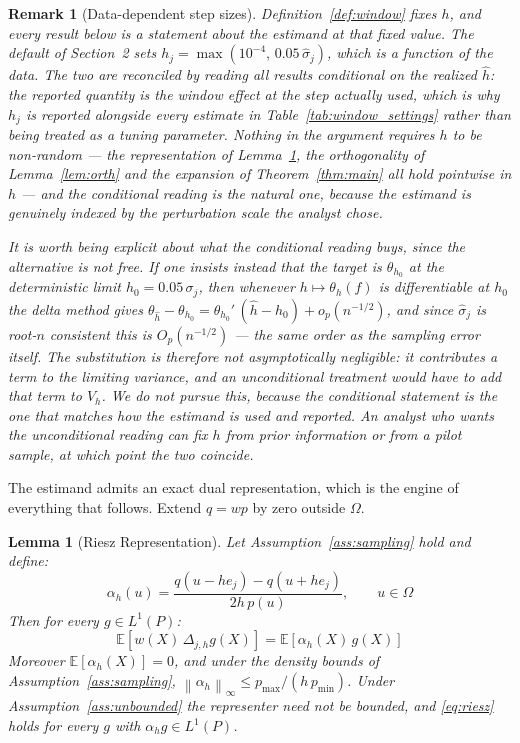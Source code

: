 \documentclass[12pt]{article}
\newtheorem{lemma}{Lemma}
\newtheorem{remark}{Remark}
\newcommand{\norm}[1]{\left\| #1 \right\|}
\newcommand{\E}{\mathbb{E}}
\newcommand{\Dh}{\Delta_{j,h}}
\begin{document}
	\begin{remark}[Data-dependent step sizes]
		\label{rem:randomh}
		Definition~\ref{def:window} fixes $h$, and every result below is a
		statement about the estimand at that fixed value. The default of
		Section~2 sets $h_j = \max(10^{-4},\, 0.05\,\hat{\sigma}_j)$, which is a
		function of the data. The two are reconciled by reading all results
		conditional on the realized $\hat{h}$: the reported quantity is the
		window effect at the step actually used, which is why $h_j$ is reported
		alongside every estimate in Table~\ref{tab:window_settings} rather than
		being treated as a tuning parameter. Nothing in the argument requires
		$h$ to be non-random --- the representation of
		Lemma~\ref{lem:riesz}, the orthogonality of Lemma~\ref{lem:orth} and the
		expansion of Theorem~\ref{thm:main} all hold pointwise in $h$ --- and
		the conditional reading is the natural one, because the estimand is
		genuinely indexed by the perturbation scale the analyst chose.

		It is worth being explicit about what the conditional reading buys,
		since the alternative is not free. If one insists instead that the
		target is $\theta_{h_0}$ at the deterministic limit
		$h_0 = 0.05\,\sigma_j$, then whenever $h \mapsto \theta_h(f)$ is
		differentiable at $h_0$ the delta method gives
		$\theta_{\hat{h}} - \theta_{h_0} = \theta_{h_0}'\,(\hat{h} - h_0) +
		o_p(n^{-1/2})$, and since $\hat{\sigma}_j$ is root-$n$ consistent this
		is $O_p(n^{-1/2})$ --- the same order as the sampling error itself. The
		substitution is therefore \emph{not} asymptotically negligible: it
		contributes a term to the limiting variance, and an unconditional
		treatment would have to add that term to $V_h$. We do not pursue this,
		because the conditional statement is the one that matches how the
		estimand is used and reported. An analyst who wants the unconditional
		reading can fix $h$ from prior information or from a pilot sample, at
		which point the two coincide.
	\end{remark}
	
	The estimand admits an exact dual representation, which is the engine of everything
	that follows. Extend $q = wp$ by zero outside $\Omega$.
	
	\begin{lemma}[Riesz Representation]
		\label{lem:riesz}
		Let Assumption~\ref{ass:sampling} hold and define:
		\begin{equation}
			\alpha_h(u) = \frac{q(u - h e_j) - q(u + h e_j)}{2h\, p(u)},
			\qquad u \in \Omega
		\end{equation}
		Then for every $g \in L^1(P)$:
		\begin{equation}
			\E\left[w(X)\, \Dh g(X)\right] = \E\left[\alpha_h(X)\, g(X)\right]
			\label{eq:riesz}
		\end{equation}
		Moreover $\E[\alpha_h(X)] = 0$, and under the density bounds of
		Assumption~\ref{ass:sampling},
		$\norm{\alpha_h}_\infty \leq p_{\max} / (h\, p_{\min})$. Under
		Assumption~\ref{ass:unbounded} the representer need not be bounded, and
		\eqref{eq:riesz} holds for every $g$ with $\alpha_h g \in L^1(P)$.
	\end{lemma}
	
\end{document}
